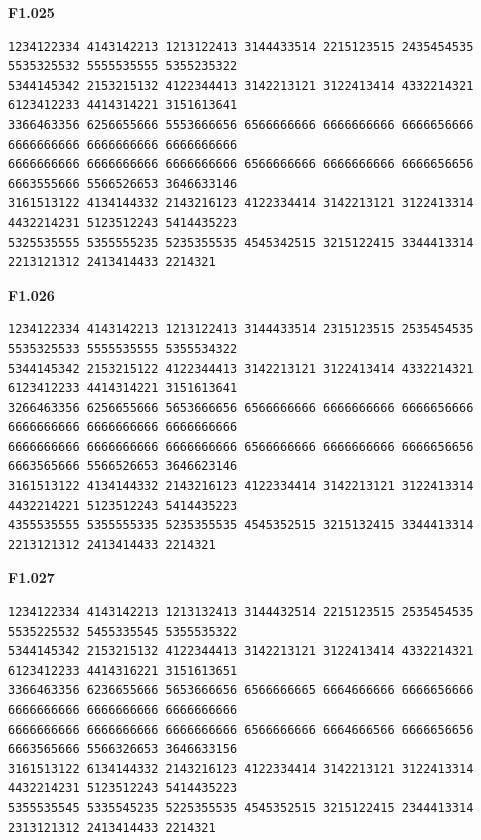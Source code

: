 \noindent\begin{minipage}{\linewidth}\textbf{F1.025}
\begin{lstlisting}
1234122334 4143142213 1213122413 3144433514 2215123515 2435454535 5535325532 5555535555 5355235322
5344145342 2153215132 4122344413 3142213121 3122413414 4332214321 6123412233 4414314221 3151613641
3366463356 6256655666 5553666656 6566666666 6666666666 6666656666 6666666666 6666666666 6666666666
6666666666 6666666666 6666666666 6566666666 6666666666 6666656656 6663555666 5566526653 3646633146
3161513122 4134144332 2143216123 4122334414 3142213121 3122413314 4432214231 5123512243 5414435223
5325535555 5355555235 5235355535 4545342515 3215122415 3344413314 2213121312 2413414433 2214321
\end{lstlisting}
\end{minipage}\par\smallskip

\noindent\begin{minipage}{\linewidth}\textbf{F1.026}
\begin{lstlisting}
1234122334 4143142213 1213122413 3144433514 2315123515 2535454535 5535325533 5555535555 5355534322
5344145342 2153215122 4122344413 3142213121 3122413414 4332214321 6123412233 4414314221 3151613641
3266463356 6256655666 5653666656 6566666666 6666666666 6666656666 6666666666 6666666666 6666666666
6666666666 6666666666 6666666666 6566666666 6666666666 6666656656 6663565666 5566526653 3646623146
3161513122 4134144332 2143216123 4122334414 3142213121 3122413314 4432214221 5123512243 5414435223
4355535555 5355555335 5235355535 4545352515 3215132415 3344413314 2213121312 2413414433 2214321
\end{lstlisting}
\end{minipage}\par\smallskip

\noindent\begin{minipage}{\linewidth}\textbf{F1.027}
\begin{lstlisting}
1234122334 4143142213 1213132413 3144432514 2215123515 2535454535 5535225532 5455335545 5355535322
5344145342 2153215132 4122344413 3142213121 3122413414 4332214321 6123412233 4414316221 3151613651
3366463356 6236655666 5653666656 6566666665 6664666666 6666656666 6666666666 6666666666 6666666666
6666666666 6666666666 6666666666 6566666666 6664666566 6666656656 6663565666 5566326653 3646633156
3161513122 6134144332 2143216123 4122334414 3142213121 3122413314 4432214231 5123512243 5414435223
5355535545 5335545235 5225355535 4545352515 3215122415 2344413314 2313121312 2413414433 2214321
\end{lstlisting}
\end{minipage}\par\smallskip

